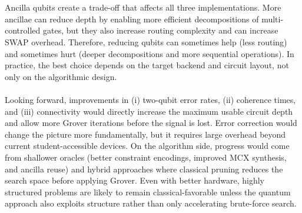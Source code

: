 \\
\\
Ancilla qubits create a trade-off that affects all three implementations. More ancillae can reduce depth by enabling more efficient decompositions of multi-controlled gates, but they also increase routing complexity and can increase SWAP overhead. Therefore, reducing qubits can sometimes help (less routing) and sometimes hurt (deeper decompositions and more sequential operations). In practice, the best choice depends on the target backend and circuit layout, not only on the algorithmic design.
\\
\\
Looking forward, improvements in (i) two-qubit error rates, (ii) coherence times, and (iii) connectivity would directly increase the maximum usable circuit depth and allow more Grover iterations before the signal is lost. Error correction would change the picture more fundamentally, but it requires large overhead beyond current student-accessible devices. On the algorithm side, progress would come from shallower oracles (better constraint encodings, improved MCX synthesis, and ancilla reuse) and hybrid approaches where classical pruning reduces the search space before applying Grover. Even with better hardware, highly structured problems are likely to remain classical-favorable unless the quantum approach also exploits structure rather than only accelerating brute-force search.

